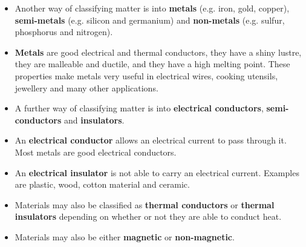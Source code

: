 \begin{itemize}
\item{Another way of classifying matter is into \textbf{metals} (e.g. iron, gold, copper), \textbf{semi-metals} (e.g. silicon and germanium) and \textbf{non-metals} (e.g. sulfur, phosphorus and nitrogen).}
\item{\textbf{Metals} are good electrical and thermal conductors, they have a shiny lustre, they are malleable and ductile, and they have a high melting point. These properties make metals very useful in electrical wires, cooking utensils, jewellery and many other applications.} 
\item{A further way of classifying matter is into \textbf{electrical conductors}, \textbf{semi-conductors} and \textbf{insulators}.}
\item{An \textbf{electrical conductor} allows an electrical current to pass through it. Most metals are good electrical conductors.}
\item{An \textbf{electrical insulator} is not able to carry an electrical current. Examples are plastic, wood, cotton material and ceramic.}
\item{Materials may also be classified as \textbf{thermal conductors} or \textbf{thermal insulators} depending on whether or not they are able to conduct heat.}
\item{Materials may also be either \textbf{magnetic} or \textbf{non-magnetic}.}
\end{itemize}



